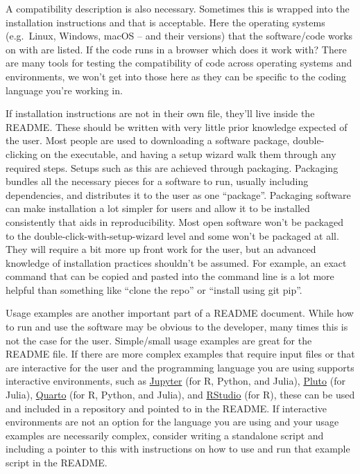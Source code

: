 \documentclass[
  letterpaper,
  DIV=11,
  numbers=noendperiod]{scrreport}
\begin{document}
A compatibility description is also necessary. Sometimes this is wrapped
into the installation instructions and that is acceptable. Here the
operating systems (e.g.~Linux, Windows, macOS -- and their versions)
that the software/code works on with are listed. If the code runs in a
browser which does it work with? There are many tools for testing the
compatibility of code across operating systems and environments, we
won't get into those here as they can be specific to the coding language
you're working in.

If installation instructions are not in their own file, they'll live
inside the README. These should be written with very little prior
knowledge expected of the user. Most people are used to downloading a
software package, double-clicking on the executable, and having a setup
wizard walk them through any required steps. Setups such as this are
achieved through packaging. Packaging bundles all the necessary pieces
for a software to run, usually including dependencies, and distributes
it to the user as one ``package''. Packaging software can make
installation a lot simpler for users and allow it to be installed
consistently that aids in reproducibility. Most open software won't be
packaged to the double-click-with-setup-wizard level and some won't be
packaged at all. They will require a bit more up front work for the
user, but an advanced knowledge of installation practices shouldn't be
assumed. For example, an exact command that can be copied and pasted
into the command line is a lot more helpful than something like ``clone
the repo'' or ``install using git pip''.

Usage examples are another important part of a README document. While
how to run and use the software may be obvious to the developer, many
times this is not the case for the user. Simple/small usage examples are
great for the README file. If there are more complex examples that
require input files or that are interactive for the user and the
programming language you are using supports interactive environments,
such as \href{https://jupyter.org/}{Jupyter} (for R, Python, and Julia),
\href{https://github.com/fonsp/Pluto.jl}{Pluto} (for Julia),
\href{https://quarto.org/}{Quarto} (for R, Python, and Julia), and
\href{https://www.rstudio.com/}{RStudio} (for R), these can be used and
included in a repository and pointed to in the README. If interactive
environments are not an option for the language you are using and your
usage examples are necessarily complex, consider writing a standalone
script and including a pointer to this with instructions on how to use
and run that example script in the README.
\end{document}
